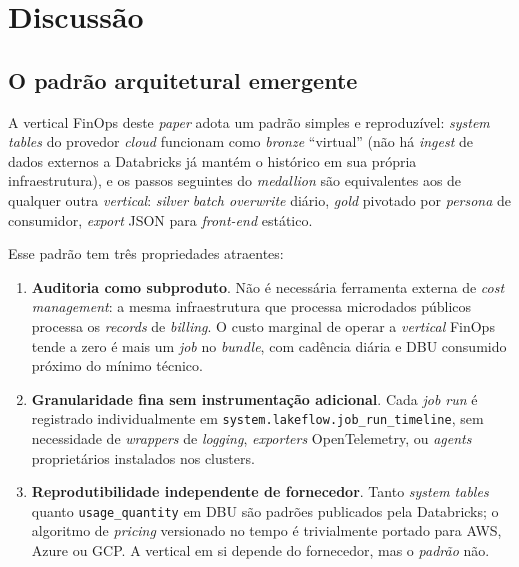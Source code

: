 \documentclass[12pt,a4paper,oneside]{article}
\begin{document}
\section{Discussão}\label{sec:discussion}

\subsection{O padrão arquitetural emergente}

A vertical FinOps deste \textit{paper} adota um padrão simples e
reproduzível: \textit{system tables} do provedor \textit{cloud}
funcionam como \textit{bronze} ``virtual'' (não há \textit{ingest}
de dados externos \textemdash{} a Databricks já mantém o histórico
em sua própria infraestrutura), e os passos seguintes do
\textit{medallion} são equivalentes aos de qualquer outra
\textit{vertical}: \textit{silver} \textit{batch overwrite}
diário, \textit{gold} pivotado por \textit{persona} de consumidor,
\textit{export} JSON para \textit{front-end} estático.

Esse padrão tem três propriedades atraentes:

\begin{enumerate}\setlength{\itemsep}{4pt}
  \item \textbf{Auditoria como subproduto}. Não é necessária
        ferramenta externa de \textit{cost management}: a mesma
        infraestrutura que processa microdados públicos processa
        os \textit{records} de \textit{billing}. O custo marginal
        de operar a \textit{vertical} FinOps tende a zero
        \textemdash{} é mais um \textit{job} no \textit{bundle},
        com cadência diária e DBU consumido próximo do mínimo
        técnico.
  \item \textbf{Granularidade fina sem instrumentação adicional}.
        Cada \textit{job run} é registrado individualmente em
        \texttt{system.lakeflow.job\_run\_timeline}, sem
        necessidade de \textit{wrappers} de \textit{logging},
        \textit{exporters} OpenTelemetry, ou \textit{agents}
        proprietários instalados nos clusters.
  \item \textbf{Reprodutibilidade independente de fornecedor}. Tanto
        \textit{system tables} quanto \texttt{usage\_quantity} em
        DBU são padrões publicados pela Databricks; o algoritmo de
        \textit{pricing} versionado no tempo é trivialmente
        portado para AWS, Azure ou GCP. A vertical em si depende
        do fornecedor, mas o \textit{padrão} não.
\end{enumerate}
\end{document}
